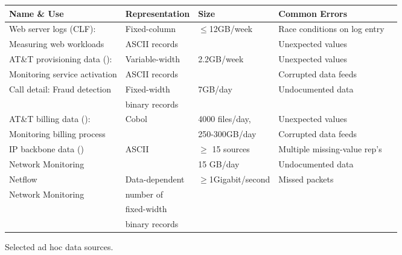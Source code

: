 \documentclass[11pt]{article}
\begin{document}
\begin{figure*}
\begin{center}
\begin{tabular}{@{}|l|l|l|l|l|}
\hline
Name \& Use                           & Representation    & Size           & Common Errors \\ \hline\hline
Web server logs (CLF):                & Fixed-column      & $\leq$12GB/week & Race conditions on log entry\\ 
Measuring web workloads               & ASCII records     &                             & Unexpected values\\ \hline
AT\&T provisioning data (\dibbler{}): & Variable-width    & 2.2GB/week & Unexpected values \\ 
Monitoring service activation         & ASCII records     &            & Corrupted data feeds \\ \hline
Call detail: Fraud detection          & Fixed-width       &\appr{}7GB/day &  Undocumented data\\
                                      & binary records  & & \\ \hline 
AT\&T billing data (\ningaui{}):      & Cobol  & \appr{}4000 files/day, & Unexpected values\\ 
Monitoring billing process   &                             & 250-300GB/day    & Corrupted data feeds \\ \hline
IP backbone data (\darkstar{})  & ASCII  & $\ge$ 15 sources  & Multiple missing-value rep's \\
Network Monitoring  &        & \appr{}15 GB/day              & Undocumented data \\ \hline
Netflow                               & Data-dependent      & $\ge$1Gigabit/second  & Missed packets\\ 
Network Monitoring        & number of   &                       & \\
                                      & fixed-width && \\
                                      & binary records && \\ \hline

\end{tabular}
\caption{Selected ad hoc data sources.}
\label{figure:data-sources}
\end{center}
\end{figure*}
\end{document}
